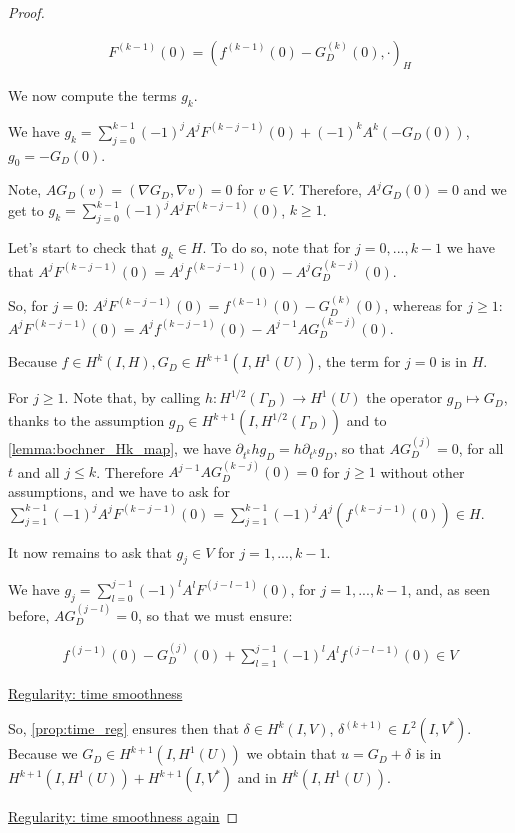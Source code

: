 \documentclass[english,a4paper,9pt,oneside]{scrbook}	%
\theoremstyle{break}
\newenvironment{mproof}[1][\proofname]{%
  \begin{proof}[#1]$ $\par\nobreak\ignorespaces
}{%
  \end{proof}
}
\renewcommand*{\proofname}{Proof}
\theoremstyle{remark}
\begin{document}
\begin{appendices}
\begin{mproof}
\begin{align*}
	F^{(k-1)}(0) = (f^{(k-1)}(0) - G^{(k)}_D (0), \cdot)_H
\end{align*}

We now compute the terms $g_k$.

We have $g_k = \sum_{j=0}^{k-1}(-1)^j A^j F^{(k-j-1)}(0) + (-1)^k A^k( - G_D(0))$, $g_0 = -G_D(0)$.


Note, $AG_D(v) = (\nabla G_D, \nabla v )=0$ for $v \in V$. Therefore, $A^jG_D(0)=0$ and we get to $g_k = \sum_{j=0}^{k-1}(-1)^j A^j F^{(k-j-1)}(0)$, $k \geq 1$.

Let's start to check that $g_k \in H$. To do so, note that for $j=0, ..., k-1$ we have that $A^j F^{(k-j-1)}(0) = A^j f^{(k-j-1)}(0)  -A^j G^{(k-j)}_D (0)$.

So, for $j=0$: $A^j F^{(k-j-1)}(0) = f^{(k-1)}(0)  - G^{(k)}_D (0)$, whereas for $j\geq1$: $A^j F^{(k-j-1)}(0) = A^jf^{(k-j-1)}(0)  -A^{j-1} A G^{(k-j)}_D (0)$.

Because $f \in H^k(I,H), G_D \in H^{k+1}(I, H^1(U))$, the term for $j=0$ is in $H$.

For $j\geq1$. Note that, by calling $h: H^{1/2}(\Gamma_D)\rightarrow H^1(U)$ the operator $g_D\mapsto G_D$, thanks to the assumption $g_D \in H^{k+1}(I, H^{1/2}(\Gamma_D))$ and to \cref{lemma:bochner_Hk_map}, we have $\partial_{t^k} h g_D = h \partial_{t^k} g_D$, so that $A G^{(j)}_D = 0$, for all $t$ and all $j\leq k$. Therefore $A^{j-1} A G^{(k-j)}_D (0)=0$ for $j\geq 1$ without other assumptions, and we have to ask for $ \sum_{j=1}^{k-1}(-1)^j A^j F^{(k-j-1)}(0) = \sum_{j=1}^{k-1}(-1)^jA^j(f^{(k-j-1)}(0))\in H$.

It now remains to ask that $g_j \in V$ for $j=1,...,k-1$.

We have $g_j = \sum_{l=0}^{j-1}(-1)^l A^l F^{(j-l-1)}(0)$, for $j=1,...,k-1$, and, as seen before, $AG_D^{(j-l)}=0$, so that we must ensure:

\begin{align*}
	f^{(j-1)}(0) - G_D^{(j)}(0) + \sum_{l=1}^{j-1}(-1)^l A^l f^{(j-l-1)}(0)  \in V
\end{align*}

\underline{Regularity: time smoothness}

So, \cref{prop:time_reg} ensures then that $\delta \in H^k(I,V)$, $\delta^{(k+1)} \in L^2(I,V^*)$. Because we $G_D \in H^{k+1}(I,H^1(U))$ we obtain that $u = G_D + \delta$ is in $H^{k+1}(I,H^1(U)) + H^{k+1}(I,V^*)$ and in $H^k(I,H^{1}(U))$.

\underline{Regularity: time smoothness again}


\end{mproof}
\end{appendices}
\end{document}
